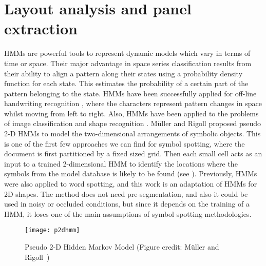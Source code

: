 \section{Layout analysis and panel extraction}
\label{sec:sota-ss:hmm}
HMMs are powerful tools to represent dynamic models which vary in terms of time or space. Their major advantage in space series classification results from their ability to align a pattern along their states using a probability density function for each state. This estimates the probability of a certain part of the pattern belonging to the state. HMMs have been successfully applied for off-line handwriting recognition \cite{El-Yacoubi1999,Espana-Boquera2011}, where the characters represent pattern changes in space whilst moving from left to right. Also, HMMs have been applied to the problems of image classification and shape recognition \cite{He1991}. M\"{u}ller and Rigoll \cite{Muller2000} proposed pseudo 2-D HMMs to model the two-dimensional arrangements of symbolic objects. This is one of the first few approaches we can find for symbol spotting, where the document is first partitioned by a fixed sized grid. Then each small cell acts as an input to a trained 2-dimensional HMM to identify the locations where the symbols from the model database is likely to be found (see ). Previously, HMMs were also applied to word spotting, and this work is an adaptation of HMMs for 2D shapes. The method does not need pre-segmentation, and also it could be used in noisy or occluded conditions, but since it depends on the training of a HMM, it loses one of the main assumptions of symbol spotting methodologies.
\begin{figure}
\begin{center}
\texttt{[image: p2dhmm]}
\end{center}
\caption{Pseudo 2-D Hidden Markov Model (Figure credit: M\"{u}ller and Rigoll~\cite{Muller2000})}
\label{fig:sota-ss:p2dhmm}
\end{figure}

